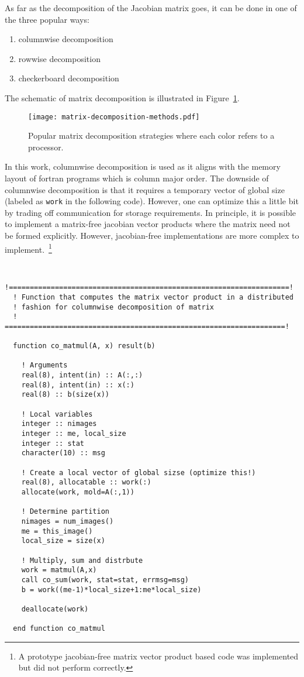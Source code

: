 \documentclass[12pt]{report}
\begin{document}
As far as the decomposition of the Jacobian matrix goes, it can be
done in one of the three popular ways:
\begin{enumerate}
\item columnwise decomposition
\item rowwise decomposition
\item checkerboard decomposition
\end{enumerate}
The schematic of matrix decomposition is illustrated in Figure~\ref{fig:matrix-decomposition}.
\begin{figure}[H]
  \centering
  \texttt{[image: matrix-decomposition-methods.pdf]}
  \caption{Popular matrix decomposition strategies where each color
    refers to a processor.}
  \label{fig:matrix-decomposition}
\end{figure}

In this work, columnwise decomposition is used as it aligns with the
memory layout of fortran programs which is column major order. The
downside of columnwise decomposition is that it requires a temporary
vector of global size (labeled as \texttt{work} in the following
code).  However, one can optimize this a little bit by trading off
communication for storage requirements. In principle, it is possible
to implement a matrix-free jacobian vector products where the matrix
need not be formed explicitly. However, jacobian-free implementations
are more complex to implement.~\footnote{A prototype jacobian-free
  matrix vector product based code was implemented but did not perform
  correctly.}

\begin{verbatim}

  !===================================================================!
  ! Function that computes the matrix vector product in a distributed
  ! fashion for columnwise decomposition of matrix
  ! ===================================================================!
  
  function co_matmul(A, x) result(b)

    ! Arguments
    real(8), intent(in) :: A(:,:)
    real(8), intent(in) :: x(:)
    real(8) :: b(size(x))
    
    ! Local variables
    integer :: nimages
    integer :: me, local_size
    integer :: stat
    character(10) :: msg

    ! Create a local vector of global sizse (optimize this!)
    real(8), allocatable :: work(:)
    allocate(work, mold=A(:,1))

    ! Determine partition
    nimages = num_images()
    me = this_image()
    local_size = size(x)

    ! Multiply, sum and distrbute
    work = matmul(A,x)
    call co_sum(work, stat=stat, errmsg=msg)
    b = work((me-1)*local_size+1:me*local_size)

    deallocate(work)

  end function co_matmul

\end{verbatim}
\end{document}
